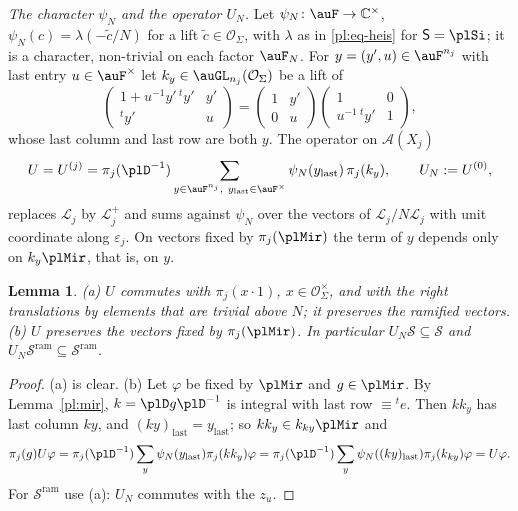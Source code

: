 \documentclass[10pt]{amsart}
\newtheorem{lemma}[theorem]{Lemma}
\theoremstyle{definition}
\theoremstyle{remark}
\newcommand{\C}{\mathbb C}
\providecommand{\auO}{\mathcal O}
\providecommand{\auS}{\mathcal S}
\providecommand{\auSram}{\mathcal S^{\mathrm{ram}}}
\begin{document}
\emph{The character $\psi_N$ and the operator $U_N$.} Let $\psi_N\colon\auF\to\C^\times$,
$\psi_N(c)=\lambda(-\tilde c/N)$ for a lift $\tilde c\in\auO_\Sigma$, with $\lambda$ as in
\eqref{pl:eq-heis} for $\mathsf S=\plSi$; it is a character, non-trivial on each factor $\auF_N$.
For $y=(y',u)\in\auF^{n_j}$ with last entry $u\in\auF^\times$ let $k_y\in\auGL_{n_j}(\auO_\Sigma)$
be a lift of
\[
\begin{pmatrix}1+u^{-1}y'\,{}^ty'&y'\\{}^ty'&u\end{pmatrix}=\begin{pmatrix}1&y'\\0&u\end{pmatrix}
\begin{pmatrix}1&0\\u^{-1}\,{}^ty'&1\end{pmatrix},
\]
whose last column and last row are both $y$. The operator on $\mathcal A(X_j)$
\begin{equation}\label{pl:eq-U}
U=U^{(j)}=\pi_j(\plD^{-1})\sum_{y\in\auF^{n_j},\ y_{\mathrm{last}}\in\auF^\times}\psi_N(y_{
\mathrm{last}})\,\pi_j(k_y),\qquad U_N:=U^{(0)},
\end{equation}
replaces $\mathcal L_j$ by $\mathcal L_j^+$ and sums against $\psi_N$ over the vectors of $\mathcal L_j/N\mathcal L_j$ with unit
coordinate along $\varepsilon_j$. On vectors fixed by $\pi_j(\plMir)$ the term of $y$ depends only
on $k_y\plMir$, that is, on $y$.

\begin{lemma}\label{pl:Uprop}
{\rm(a)} $U$ commutes with $\pi_j(x\cdot1)$, $x\in\auO_\Sigma^\times$, and with the right
translations by elements that are trivial above $N$; it preserves the ramified vectors.
{\rm(b)} $U$ preserves the vectors fixed by $\pi_j(\plMir)$. In particular $U_N\auS\subseteq\auS$
and $U_N\auSram\subseteq\auSram$.
\end{lemma}
\begin{proof}
(a) is clear. (b) Let $\varphi$ be fixed by $\plMir$ and $g\in\plMir$. By Lemma~\ref{pl:mir},
$k=\plD g\plD^{-1}$ is integral with last row $\equiv{}^te$. Then $kk_y$ has last column $ky$, and
$(ky)_{\mathrm{last}}=y_{\mathrm{last}}$; so $kk_y\in k_{ky}\plMir$ and
\[
\pi_j(g)U\varphi=\pi_j(\plD^{-1})\sum_y\psi_N(y_{\mathrm{last}})\pi_j(kk_y)\varphi=\pi_j(\plD^{-1})
\sum_y\psi_N((ky)_{\mathrm{last}})\pi_j(k_{ky})\varphi=U\varphi .
\]
For $\auSram$ use (a): $U_N$ commutes with the $z_u$.
\end{proof}
\end{document}

